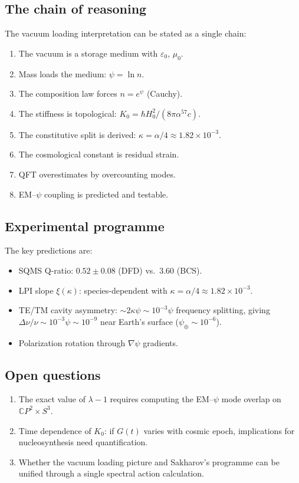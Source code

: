 \documentclass[aps,prd,twocolumn,superscriptaddress,nofootinbib]{revtex4-2}
\newcommand{\CP}{\mathbb{C}P}
\begin{document}
\subsection{The chain of reasoning}

The vacuum loading interpretation can be stated as a single chain:
\begin{enumerate}
\item The vacuum is a storage medium with $\varepsilon_0$, $\mu_0$.
\item Mass loads the medium: $\psi = \ln n$.
\item The composition law forces $n = e^\psi$ (Cauchy).
\item The stiffness is topological:
$K_0 = \hbar H_0^2/(8\pi\alpha^{57}c)$.
\item The constitutive split is derived:
$\kappa = \alpha/4 \approx 1.82 \times 10^{-3}$.
\item The cosmological constant is residual strain.
\item QFT overestimates by overcounting modes.
\item EM--$\psi$ coupling is predicted and testable.
\end{enumerate}

\subsection{Experimental programme}

The key predictions are:
\begin{itemize}
\item SQMS Q-ratio: $0.52 \pm 0.08$ (DFD) vs.\ $3.60$ (BCS).
\item LPI slope $\xi(\kappa)$: species-dependent with
$\kappa = \alpha/4 \approx 1.82 \times 10^{-3}$.
\item TE/TM cavity asymmetry: $\sim 2\kappa\psi \sim 10^{-3}\psi$
frequency splitting, giving $\Delta\nu/\nu \sim 10^{-3}\psi
\sim 10^{-9}$ near Earth's surface ($\psi_\oplus \sim 10^{-6}$).
\item Polarization rotation through $\nabla\psi$ gradients.
\end{itemize}

\subsection{Open questions}

\begin{enumerate}
\item The exact value of $\lambda - 1$ requires computing the
EM--$\psi$ mode overlap on $\CP^2 \times S^3$.
\item Time dependence of $K_0$: if $G(t)$ varies with cosmic epoch,
implications for nucleosynthesis need quantification.
\item Whether the vacuum loading picture and Sakharov's programme can
be unified through a single spectral action calculation.
\end{enumerate}
\end{document}

